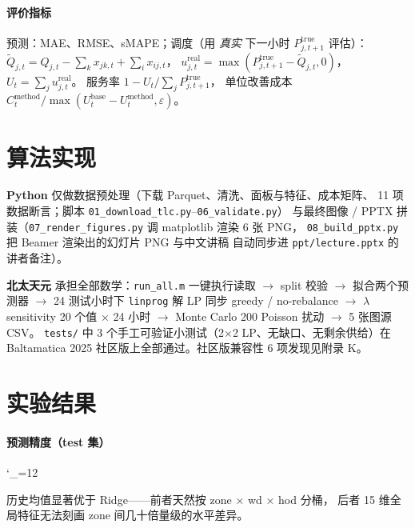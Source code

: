 \documentclass[12pt,a4paper]{article}
\begin{document}
\paragraph{评价指标}
预测：MAE、RMSE、sMAPE；调度（用 \emph{真实} 下一小时 $P^{\text{true}}_{j,t+1}$ 评估）：
$\widetilde Q_{j,t} = Q_{j,t} - \sum_k x_{jk,t} + \sum_i x_{ij,t}$，
$u^{\text{real}}_{j,t} = \max(P^{\text{true}}_{j,t+1} - \widetilde Q_{j,t}, 0)$，
$U_t = \sum_j u^{\text{real}}_{j,t}$。
服务率 $1 - U_t/\sum_j P^{\text{true}}_{j,t+1}$，
单位改善成本 $C_t^{\text{method}}/\max(U_t^{\text{base}} - U_t^{\text{method}}, \varepsilon)$。

\section{算法实现}\label{sec:impl}
\vspace{-0.4em}

\textbf{Python} 仅做数据预处理（下载 Parquet、清洗、面板与特征、成本矩阵、
11 项数据断言；脚本 \verb|01_download_tlc.py|--\verb|06_validate.py|）
与最终图像 / PPTX 拼装（\verb|07_render_figures.py| 调 matplotlib 渲染 6 张 PNG，
\verb|08_build_pptx.py| 把 Beamer 渲染出的幻灯片 PNG 与中文讲稿
自动同步进 \verb|ppt/lecture.pptx| 的讲者备注）。

\textbf{北太天元} 承担全部数学：\verb|run_all.m| 一键执行读取
$\rightarrow$ split 校验 $\rightarrow$ 拟合两个预测器
$\rightarrow$ 24 测试小时下 \verb|linprog| 解 LP 同步 greedy / no-rebalance
$\rightarrow$ $\lambda$ sensitivity 20 个值 × 24 小时
$\rightarrow$ Monte Carlo 200 Poisson 扰动
$\rightarrow$ 5 张图源 CSV。
\verb|tests/| 中 3 个手工可验证小测试（2$\times$2 LP、无缺口、无剩余供给）在
Baltamatica 2025 社区版上全部通过。社区版兼容性 6 项发现见附录 K。

\section{实验结果}\label{sec:result}
\vspace{-0.4em}

\paragraph{预测精度（test 集）}
\begin{center}\small
\begingroup\catcode`\_=12
\endgroup
\end{center}
历史均值显著优于 Ridge——前者天然按 zone × wd × hod 分桶，
后者 15 维全局特征无法刻画 zone 间几十倍量级的水平差异。
\end{document}
